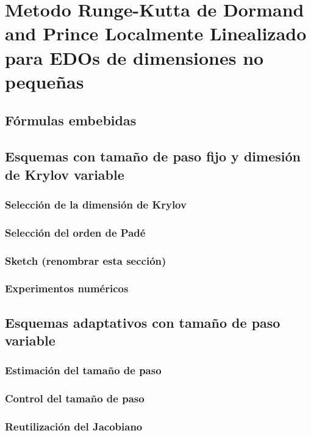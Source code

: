 \chapter{Metodo Runge-Kutta de Dormand and Prince Localmente Linealizado para EDOs de
dimensiones no pequeñas}\label{chapter:llrk}

\section{Fórmulas embebidas}


\section{Esquemas con tamaño de paso fijo y dimesión de Krylov variable}

\subsection{Selección de la dimensión de Krylov}

\subsection{Selección del orden de Padé}

\subsection{Sketch (renombrar esta sección)}

\subsection{Experimentos numéricos}


\section{Esquemas adaptativos con tamaño de paso variable}

\subsection{Estimación del tamaño de paso}

\subsection{Control del tamaño de paso}

\subsection{Reutilización del Jacobiano}

